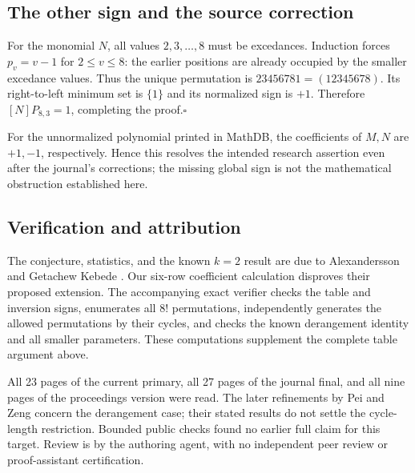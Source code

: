 \documentclass[11pt]{article}
\begin{document}
\subsection*{The other sign and the source correction}
For the monomial $N$, all values $2,3,\ldots,8$ must be excedances.
Induction forces $p_v=v-1$ for $2\le v\le8$: the earlier positions
are already occupied by the smaller excedance values. Thus the
unique permutation is $23456781=(12345678)$. Its right-to-left
minimum set is $\{1\}$ and its normalized sign is $+1$.
Therefore $[N]P_{8,3}=1$, completing the proof.\hfill$\square$

For the unnormalized polynomial printed in MathDB, the coefficients
of $M,N$ are $+1,-1$, respectively. Hence this resolves the intended
research assertion even after the journal's corrections; the missing
global sign is not the mathematical obstruction established here.

\subsection*{Verification and attribution}
The conjecture, statistics, and the known $k=2$ result are due to
Alexandersson and Getachew Kebede \cite{final,preprint}. Our six-row
coefficient calculation disproves their proposed extension.
The accompanying exact verifier checks the table and inversion signs,
enumerates all $8!$ permutations, independently generates the allowed
permutations by their cycles, and checks the known derangement
identity and all smaller parameters. These computations supplement
the complete table argument above.

All 23 pages of the current primary, all 27 pages of the journal
final, and all nine pages of the proceedings version were read.
The later refinements by Pei and Zeng \cite{pz} concern the
derangement case; their stated results do not settle the cycle-length
restriction. Bounded public checks found no earlier full claim for
this target. Review is by the authoring agent, with no independent
peer review or proof-assistant certification.
\end{document}
